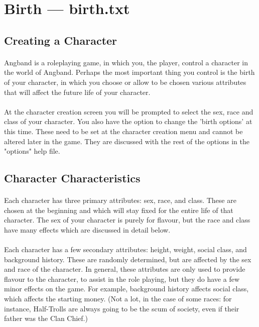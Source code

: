 \section{Birth --- birth.txt}
\subsection{Creating a Character}
\paragraph{}Angband is a roleplaying game, in which you, the player, control a
character in the world of Angband. Perhaps the most important thing you
control is the birth of your character, in which you choose or allow to
be chosen various attributes that will affect the future life of your
character.

\paragraph{}At the character creation screen you will be prompted to select the sex,
race and class of your character. You also have the option to change
the 'birth options' at this time. These need to be set at the character
creation menu and cannot be altered later in the game. They are
discussed with the rest of the options in the "options" help file.


\subsection{Character Characteristics}
\paragraph{}Each character has three primary attributes: sex, race, and class. These
are chosen at the beginning and which will stay fixed for the entire
life of that character. The sex of your character is purely for
flavour, but the race and class have many effects which are discussed in
detail below.

\paragraph{}Each character has a few secondary attributes: height, weight, social
class, and background history. These are randomly determined, but are
affected by the sex and race of the character. In general, these
attributes are only used to provide flavour to the character, to assist
in the role playing, but they do have a few minor effects on the game.
For example, background history affects social class, which affects the
starting money. (Not a lot, in the case of some races: for instance,
Half-Trolls are always going to be the scum of society, even if their
father was the Clan Chief.)

